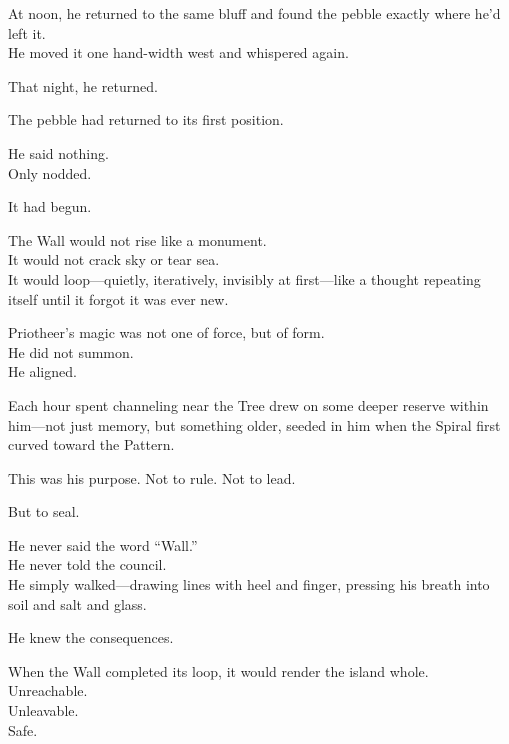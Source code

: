 \documentclass[12pt]{article}
\begin{document}
\vspace{0.5em}
At noon, he returned to the same bluff and found the pebble exactly where he’d left it.\\
He moved it one hand-width west and whispered again.

\vspace{0.5em}
That night, he returned.

\vspace{0.5em}
The pebble had returned to its first position.

\vspace{0.5em}
He said nothing.\\
Only nodded.

\vspace{0.5em}
It had begun.

\vspace{0.5em}
The Wall would not rise like a monument.\\
It would not crack sky or tear sea.\\
It would loop---quietly, iteratively, invisibly at first---like a thought repeating itself until it forgot it was ever new.

\vspace{0.5em}
Priotheer’s magic was not one of force, but of form.\\
He did not summon.\\
He aligned.

\vspace{0.5em}
Each hour spent channeling near the Tree drew on some deeper reserve within him---not just memory, but something older, seeded in him when the Spiral first curved toward the Pattern.

\vspace{0.5em}
This was his purpose. Not to rule. Not to lead.

\vspace{0.5em}
But to seal.

\vspace{0.5em}
He never said the word ``Wall.''\\
He never told the council.\\
He simply walked---drawing lines with heel and finger, pressing his breath into soil and salt and glass.

\vspace{0.5em}
He knew the consequences.

\vspace{0.5em}
When the Wall completed its loop, it would render the island whole.\\
Unreachable.\\
Unleavable.\\
Safe.
\end{document}
